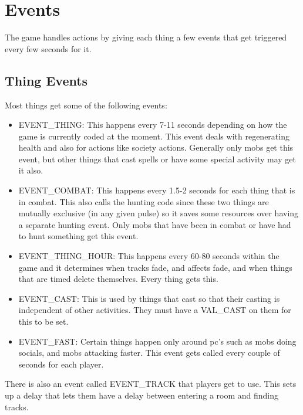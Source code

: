 \chapter{Events}


The game handles actions by giving each thing a few events that get
triggered every few seconds for it.

\section{Thing Events}
 Most things get some of the
following events:

\begin{itemize}



\item EVENT\_THING: This happens every 7-11 seconds depending on how
the game is currently coded at the moment. This event deals with
regenerating health and also for actions like society
actions. Generally only mobs get this event, but other things that
cast spells or have some special activity may get it also.

\item EVENT\_COMBAT: This happens every 1.5-2 seconds for each thing
that is in combat. This also calls the hunting code since these two
things are mutually exclusive (in any given pulse) so it saves some
resources over having a separate hunting event. Only mobs that have
been in combat or have had to hunt something get this event.

\item EVENT\_THING\_HOUR: This happens every 60-80 seconds within the game
and it determines when tracks fade, and affects fade, and when things
that are timed delete themselves. Every thing gets this.

\item EVENT\_CAST: This is used by things that cast so that their
casting is independent of other activities. They must have a VAL\_CAST
on them for this to be set.
 
\item EVENT\_FAST: Certain things happen only around pc's such as
mobs doing socials, and mobs attacking faster. This event gets called
every couple of seconds for each player.


\end{itemize}

There is also an event called EVENT\_TRACK that players get to
use. This sets up a delay that lets them have a delay between entering
a room and finding tracks.

